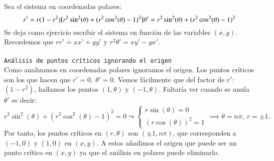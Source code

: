 \begin{eg}
    Sea el sistema en coordenadas polares:
    $$
        r' = r(1-r^2) [r^2 \sin^2(\theta) + (r^2\cos^2(\theta) -1 )^2]\\
        \theta' = r^2 \sin^2(\theta) + (r^2\cos^2(\theta) -1 )^2
    $$
    Se deja como ejercicio escribir el sistema en función de las variables $(x, y)$. Recordemos que $rr' = xx' + yy'$ y $r^2\theta' = xy' - yx'$.
    \\\\\texttt{Análisis de puntos críticos ignorando el origen}\\
    Como analizamos en coordenadas polares ignoramos el origen. Los puntos críticos son los que hacen que $r' = 0,\ \theta' = 0$. Vemos fácilmente que del factor de $r'$: $(1-r^2)$, hallamos los puntos $(1, \theta)$ y $(-1, \theta)$. Faltaría ver cuando se anula $\theta'$ es decir:
    $$
        r^2 \sin^2(\theta) + (r^2\cos^2(\theta) -1 )^2 = 0 \leadsto
            \begin{cases}
                r\sin(\theta) = 0\\
                (r\cos(\theta))^2 = 1
            \end{cases} \implies \theta = n\pi,\ r = \pm 1.
    $$
    Por tanto, los puntos críticos en $(r, \theta)$ son $(\pm 1, n \pi)$, que corresponden a $(-1, 0)$ y $(1, 0)$ en $(x, y)$. A estos añadimos el origen que puede ser un punto crítico en $(x, y)$ ya que el análisis en polares puede eliminarlo.

\end{eg}
